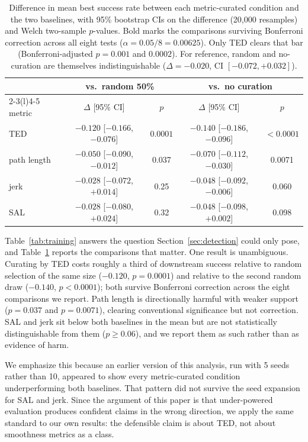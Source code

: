 \documentclass[10pt]{article}
\begin{document}
\begin{table}[t]
\centering
\small
\begin{tabular}{lcccc}
\toprule
& \multicolumn{2}{c}{vs.\ random 50\%} & \multicolumn{2}{c}{vs.\ no curation} \\
\cmidrule(lr){2-3}\cmidrule(l){4-5}
metric & $\Delta$ [95\% CI] & $p$ & $\Delta$ [95\% CI] & $p$ \\
\midrule
TED         & $-0.120$ [$-0.166$, $-0.076$] & $\mathbf{0.0001}$ & $-0.140$ [$-0.186$, $-0.096$] & $\mathbf{<0.0001}$ \\
path length & $-0.050$ [$-0.090$, $-0.012$] & 0.037 & $-0.070$ [$-0.112$, $-0.030$] & 0.0071 \\
jerk        & $-0.028$ [$-0.072$, $+0.014$] & 0.25 & $-0.048$ [$-0.092$, $-0.006$] & 0.060 \\
SAL         & $-0.028$ [$-0.080$, $+0.024$] & 0.32 & $-0.048$ [$-0.098$, $+0.002$] & 0.098 \\
\bottomrule
\end{tabular}
\caption{Difference in mean best success rate between each metric-curated
condition and the two baselines, with 95\% bootstrap CIs on the difference
(20{,}000 resamples) and Welch two-sample $p$-values. Bold marks the
comparisons surviving Bonferroni correction across all eight tests
($\alpha = 0.05/8 = 0.00625$). Only TED clears that bar (Bonferroni-adjusted $p = 0.001$ and $0.0002$). For reference,
random and no-curation are themselves indistinguishable
($\Delta = -0.020$, CI $[-0.072, +0.032]$).}
\label{tab:tests}
\end{table}

Table~\ref{tab:training} answers the question Section~\ref{sec:detection}
could only pose, and Table~\ref{tab:tests} reports the comparisons that
matter. One result is unambiguous. Curating by TED costs roughly a third
of downstream success relative to random selection of the same size
($-0.120$, $p = 0.0001$) and relative to the second random draw ($-0.140$,
$p < 0.0001$); both survive Bonferroni correction across the eight
comparisons we report. Path length is directionally harmful with weaker
support ($p = 0.037$ and $p = 0.0071$), clearing conventional significance
but not correction. SAL and jerk sit below both baselines in the mean but
are not statistically distinguishable from them ($p \geq 0.06$), and we
report them as such rather than as evidence of harm.

We emphasize this because an earlier version of this analysis, run with
5 seeds rather than 10, appeared to show every metric-curated condition
underperforming both baselines. That pattern did not survive the seed
expansion for SAL and jerk. Since the argument of this paper is that
under-powered evaluation produces confident claims in the wrong direction,
we apply the same standard to our own results: the defensible claim is about
TED, not about smoothness metrics as a class.
\end{document}
